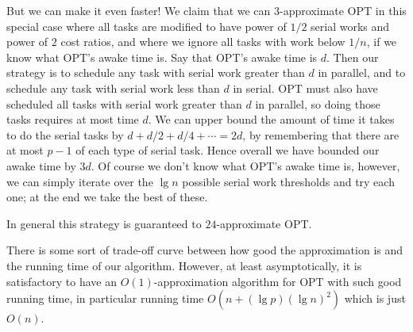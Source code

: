 {But we can make it even faster!
We claim that we can $3$-approximate OPT in this special case
where all tasks are modified to have power of $1/2$ serial works
and power of $2$ cost ratios, and where we ignore all tasks with
work below $1/n$, if we know what OPT's awake time is.
Say that OPT's awake time is $d$. Then our strategy is to
schedule any task with serial work greater than $d$ in parallel,
and to schedule any task with serial work less than $d$ in
serial. OPT must also have scheduled all tasks with serial work
greater than $d$ in parallel, so doing those tasks requires at
most time $d$. We can upper bound the amount of time it takes to
do the serial tasks by $d + d/2 + d/4 + \cdots = 2d$, by
remembering that there are at most $p-1$ of each type of serial
task. Hence overall we have bounded our awake time by $3d$.
Of course we don't know what OPT's awake time is, however, we can
simply iterate over the $\lg n$ possible serial work thresholds and
try each one; at the end we take the best of these.

In general this strategy is guaranteed to $24$-approximate OPT.

There is some sort of trade-off curve between how good the
approximation is and the running time of our algorithm.
However, at least asymptotically, it is satisfactory to have an
$O(1)$-approximation algorithm for OPT with such good running
time, in particular running time $O(n + (\lg p)(\lg n)^2)$ which is
just $O(n)$.
}

